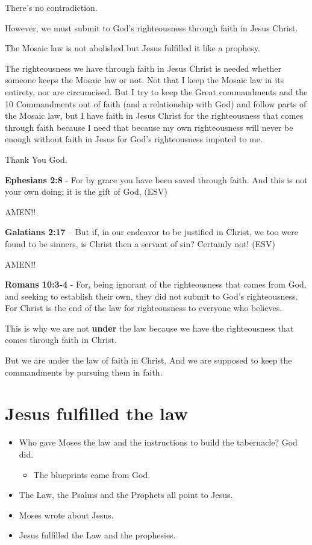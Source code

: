 \documentclass[11pt]{article}
\begin{document}
There's no contradiction.

However, we must submit to God's righteousness through faith in Jesus Christ.

The Mosaic law is not abolished but Jesus fulfilled it like a prophesy.

The righteousness we have through faith in Jesus Christ is needed whether someone keeps the Mosaic law or not.
Not that I keep the Mosaic law in its entirety, nor are circumcised. But I try to keep the Great commandments
and the 10 Commandments out of faith (and a relationship with God) and follow parts of the Mosaic law,
but I have faith in Jesus Christ for the righteousness that comes through faith because I need that because my own
righteousness will never be enough without faith in Jesus for God's righteousness imputed to me.

Thank You God.

\textbf{Ephesians 2:8} -  For by grace you have been saved through faith.  And this is not your own doing; it is the gift of God,  (ESV)

AMEN!!

\textbf{Galatians 2:17} -- But if, in our endeavor to be justified in Christ, we too were found to be sinners, is Christ then a servant of sin? Certainly not! (ESV)

AMEN!!

\textbf{Romans 10:3-4} - For, being ignorant of the righteousness that comes from God, and seeking to establish their own, they did not submit to God's righteousness. For Christ is the end of the law for righteousness to everyone who believes.

This is why we are not \textbf{under} the law because we have the righteousness that comes through faith in Christ.

But we are under the law of faith in Christ.
And we are supposed to keep the commandments by pursuing them in faith.

\section{Jesus fulfilled the law}
\label{sec:orgfc64cf9}
\begin{itemize}
\item Who gave Moses the law and the instructions to build the tabernacle? God did.
\begin{itemize}
\item The blueprints came from God.
\end{itemize}
\item The Law, the Psalms and the Prophets all point to Jesus.
\item Moses wrote about Jesus.
\item Jesus fulfilled the Law and the prophesies.
\end{itemize}
\end{document}
